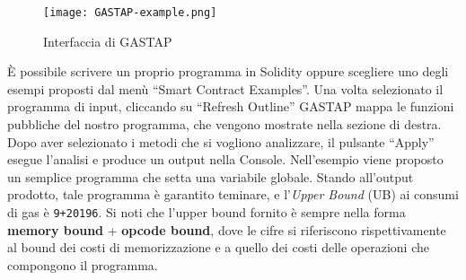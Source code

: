     \begin{figure}[h]
        \centering
        \texttt{[image: GASTAP-example.png]}
        \caption[Interfaccia di GASTAP]{Interfaccia di GASTAP}
        \label{fig:gstp-example}
    \end{figure}
    
    \`E possibile scrivere un proprio programma in Solidity oppure scegliere uno degli esempi proposti dal menù ``Smart Contract Examples''.\newline
    \indent Una volta selezionato il programma di input, cliccando su ``Refresh Outline'' GASTAP mappa le funzioni pubbliche del nostro programma, che vengono mostrate nella sezione di destra. Dopo aver selezionato i metodi che si vogliono analizzare, il pulsante ``Apply'' esegue l'analisi e produce un output nella Console.\newline
    \indent Nell'esempio viene proposto un semplice programma che setta una variabile globale. Stando all'output prodotto, tale programma è garantito teminare, e l'\textit{Upper Bound} (UB) ai consumi di gas è \verb|9+20196|. Si noti che l'upper bound fornito è sempre nella forma \textbf{memory bound} + \textbf{opcode bound}, dove le cifre si riferiscono rispettivamente al bound dei costi di memorizzazione e a quello dei costi delle operazioni che compongono il programma.\newline
